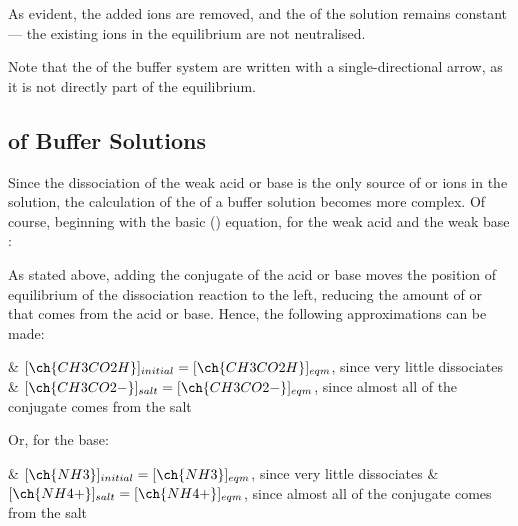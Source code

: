 
				As evident, the added  ions are removed, and the \pH{} of the solution remains constant --- the existing  ions
				in the equilibrium are not neutralised.

				Note that the  of the buffer system are written with a single-directional arrow, as it is not
				directly part of the equilibrium.



		\subsection{\texorpdfstring{\pH{}}{pH} of Buffer Solutions}

			Since the dissociation of the weak acid or base is  the only source of  or  ions in the solution,
			the calculation of the \pH{} of a buffer solution becomes more complex. Of course, beginning with the basic ()
			equation, for the weak acid  and the weak base :

			\mathdiagram{
				\[ \MKa = \frac{[\ch{CH3CO2-}]_{eqm}[\ch{H+}]_{eqm}}{[\ch{CH3CO2H}]_{eqm}} \hspace{10mm}
				\MKb = \frac{[\ch{NH4+}]_{eqm}[\ch{OH-}]_{eqm}}{[\ch{NH3}]_{eqm}} \]
			}

			As stated above, adding the conjugate of the acid or base moves the position of equilibrium of the dissociation reaction to the left,
			reducing the amount of  or  that comes from the acid or base. Hence, the following approximations can be made:

			\begin{bulletlist}
				& $[\ch{CH3CO2H}]_{initial} = [\ch{CH3CO2H}]_{eqm}$, since very little  dissociates
				& $[\ch{CH3CO2-}]_{salt} = [\ch{CH3CO2-}]_{eqm}$, since almost all of the conjugate comes from the salt
			\end{bulletlist}

			Or, for the base:
			\begin{bulletlist}
				& $[\ch{NH3}]_{initial} = [\ch{NH3}]_{eqm}$, since very little  dissociates
				& $[\ch{NH4+}]_{salt} = [\ch{NH4+}]_{eqm}$, since almost all of the conjugate comes from the salt
			\end{bulletlist}

